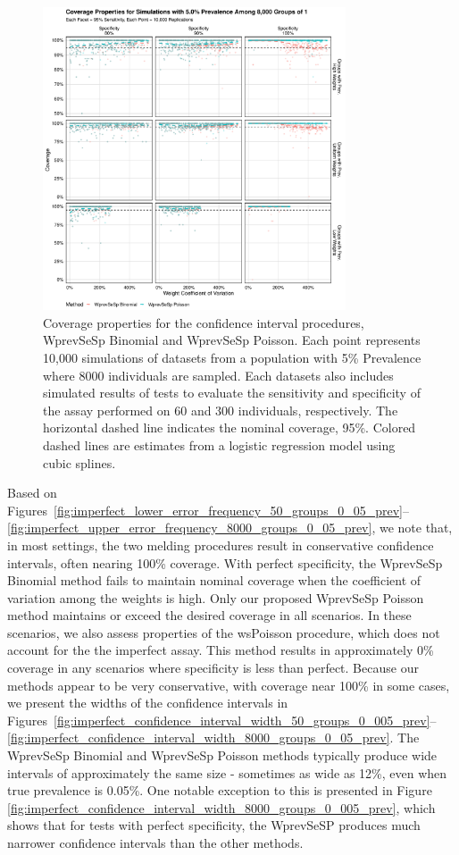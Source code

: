 \documentclass[AMA,STIX1COL]{WileyNJD-v2}
\begin{document}
\begin{figure}
\centering
\includegraphics[width=0.8\textwidth]{figures/imperfect_coverage_8000_groups_0_05_prev.pdf}
\caption{Coverage properties for the confidence interval procedures, WprevSeSp Binomial and WprevSeSp Poisson.
Each point represents 10,000 simulations of datasets from a population with 5\% Prevalence where 8000 individuals are sampled.
Each datasets also includes simulated results of tests to evaluate the sensitivity and specificity of the assay performed on 60 and 300 individuals, respectively.
The horizontal dashed line indicates the nominal coverage, 95\%.
Colored dashed lines are estimates from a logistic regression model using cubic splines.}
\label{fig:imperfect_coverage_8000_groups_0_05_prev}
\end{figure}

Based on Figures~\ref{fig:imperfect_lower_error_frequency_50_groups_0_05_prev}--\ref{fig:imperfect_upper_error_frequency_8000_groups_0_05_prev}, we note that, in most settings, the two melding procedures result in conservative confidence intervals, often nearing 100\% coverage.
With perfect specificity, the WprevSeSp Binomial method fails to maintain nominal coverage when the coefficient of variation among the weights is high.
Only our proposed WprevSeSp Poisson method maintains or exceed the desired coverage in all scenarios.
In these scenarios, we also assess properties of the wsPoisson procedure, which does not account for the the imperfect assay.
This method results in approximately 0\% coverage in any scenarios where specificity is less than perfect.
Because our methods appear to be very conservative, with coverage near 100\% in some cases, we present the widths of the confidence intervals in Figures~\ref{fig:imperfect_confidence_interval_width_50_groups_0_005_prev}--\ref{fig:imperfect_confidence_interval_width_8000_groups_0_05_prev}.
The WprevSeSp Binomial and  WprevSeSp Poisson methods typically produce wide intervals of approximately the same size - sometimes as wide as 12\%, even when true prevalence is 0.05\%.
One notable exception to this is presented in Figure \ref{fig:imperfect_confidence_interval_width_8000_groups_0_005_prev}, which shows that for tests with perfect specificity, the WprevSeSP produces much narrower confidence intervals than the other methods.
\end{document}
